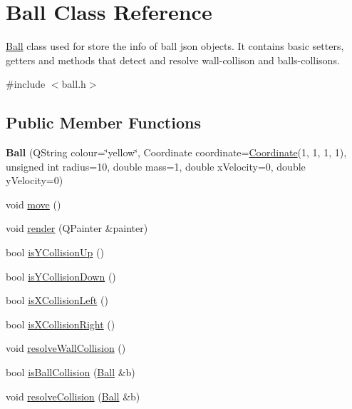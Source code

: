 \hypertarget{class_ball}{}\section{Ball Class Reference}
\label{class_ball}


\mbox{\hyperlink{class_ball}{Ball}} class used for store the info of ball json objects. It contains basic setters, getters and methods that detect and resolve wall-\/collison and balls-\/collisons.  




{\ttfamily \#include $<$ball.\+h$>$}

\subsection*{Public Member Functions}
\begin{DoxyCompactItemize}
\item 
\mbox{\label{class_ball_aad0fc9de59bff22ea99b0f3e2c3684a3}} 
{\bfseries Ball} (Q\+String colour=\char`\"{}yellow\char`\"{}, Coordinate coordinate=\mbox{\hyperlink{class_coordinate}{Coordinate}}(1, 1, 1, 1), unsigned int radius=10, double mass=1, double x\+Velocity=0, double y\+Velocity=0)
\item 
void \mbox{\hyperlink{class_ball_a05228e822d67b25baf715cf09c325494}{move}} ()
\item 
void \mbox{\hyperlink{class_ball_aaa87956d96d2537d7fe1fc9c651d9c0a}{render}} (Q\+Painter \&painter)
\item 
bool \mbox{\hyperlink{class_ball_a89220468866f8bf347277e62b400cbd6}{is\+Y\+Collision\+Up}} ()
\item 
bool \mbox{\hyperlink{class_ball_a49aaf03314ad71ad8b549605683da5cf}{is\+Y\+Collision\+Down}} ()
\item 
bool \mbox{\hyperlink{class_ball_ac78e9493b3dd882154f449fbf9d46673}{is\+X\+Collision\+Left}} ()
\item 
bool \mbox{\hyperlink{class_ball_a7ea99601caa442c45b150723fa9d5dfb}{is\+X\+Collision\+Right}} ()
\item 
void \mbox{\hyperlink{class_ball_a6a9181cac6b5363ecb9185e111ca4e3f}{resolve\+Wall\+Collision}} ()
\item 
bool \mbox{\hyperlink{class_ball_a34427cdba5ef3f0b6a7bd710234272c6}{is\+Ball\+Collision}} (\mbox{\hyperlink{class_ball}{Ball}} \&b)
\item 
void \mbox{\hyperlink{class_ball_a830543891837e6b37055b27262714e13}{resolve\+Collision}} (\mbox{\hyperlink{class_ball}{Ball}} \&b)

\end{DoxyCompactItemize}
